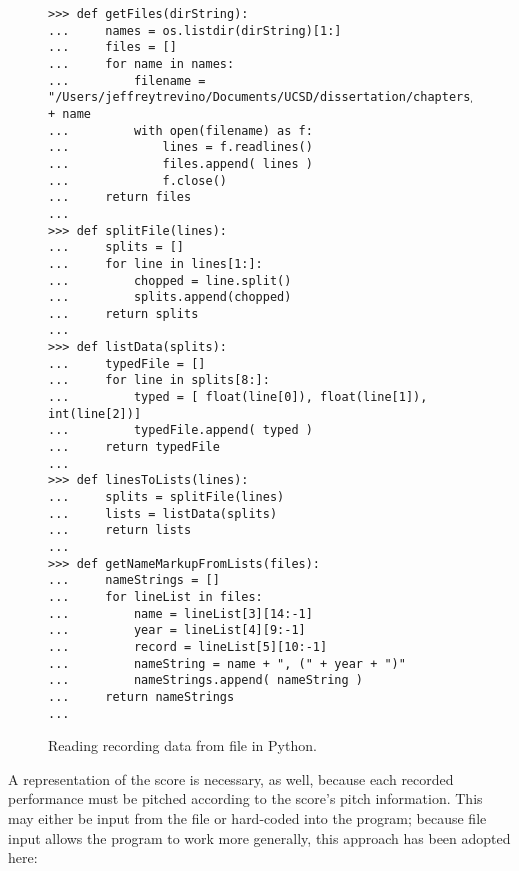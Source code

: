 \begin{figure}[H]
\begin{lstlisting}[basicstyle=\scriptsize\ttfamily, breaklines=True, tabsize=4, showtabs=false, showspaces=false]
>>> def getFiles(dirString):
...     names = os.listdir(dirString)[1:]
...     files = []
...     for name in names:
...         filename = "/Users/jeffreytrevino/Documents/UCSD/dissertation/chapters/webern/performances/mvmt1/" + name
...         with open(filename) as f:
...             lines = f.readlines()
...             files.append( lines )
...             f.close()
...     return files
... 
>>> def splitFile(lines):
...     splits = []
...     for line in lines[1:]: 
...         chopped = line.split()
...         splits.append(chopped)
...     return splits
... 
>>> def listData(splits):
...     typedFile = []
...     for line in splits[8:]:
...         typed = [ float(line[0]), float(line[1]), int(line[2])]
...         typedFile.append( typed )
...     return typedFile
... 
>>> def linesToLists(lines):
...     splits = splitFile(lines)
...     lists = listData(splits)
...     return lists
... 
>>> def getNameMarkupFromLists(files):
...     nameStrings = []
...     for lineList in files:
...         name = lineList[3][14:-1]
...         year = lineList[4][9:-1]
...         record = lineList[5][10:-1]
...         nameString = name + ", (" + year + ")"
...         nameStrings.append( nameString )
...     return nameStrings
... \end{lstlisting}

\caption{Reading recording data from file in Python. } 
\end{figure}

A representation of the score is necessary, as well, because each recorded performance must be pitched according to the score's pitch information. This may either be input from the file or hard-coded into the program; because file input allows the program to work more generally, this approach has been adopted here:

